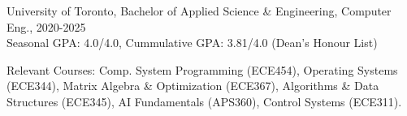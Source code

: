 University of Toronto, Bachelor of Applied Science \& Engineering, Computer Eng., 2020-2025 \\
Seasonal GPA: 4.0/4.0, Cummulative GPA: 3.81/4.0 (Dean's Honour List) \\[3.75pt]
\raggedright{Relevant Courses: Comp. System Programming (ECE454), Operating Systems (ECE344), Matrix Algebra \& Optimization (ECE367), 
Algorithms \& Data Structures (ECE345), AI Fundamentals (APS360), Control Systems (ECE311).}
